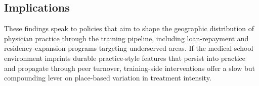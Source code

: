 \documentclass[11pt]{article}
\begin{document}
\subsection*{Implications}

These findings speak to policies that aim to shape the geographic distribution of physician practice through the training pipeline, including loan-repayment and residency-expansion programs targeting underserved areas. If the medical school environment imprints durable practice-style features that persist into practice and propagate through peer turnover, training-side interventions offer a slow but compounding lever on place-based variation in treatment intensity.
\end{document}
